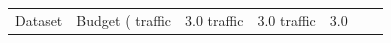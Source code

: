 \begin{tabular}{llrlrrr}
\toprule
Dataset & Budget (%
\midrule
traffic & 3.0%
traffic & 3.0%
traffic & 3.0%
\bottomrule
\end{tabular}

